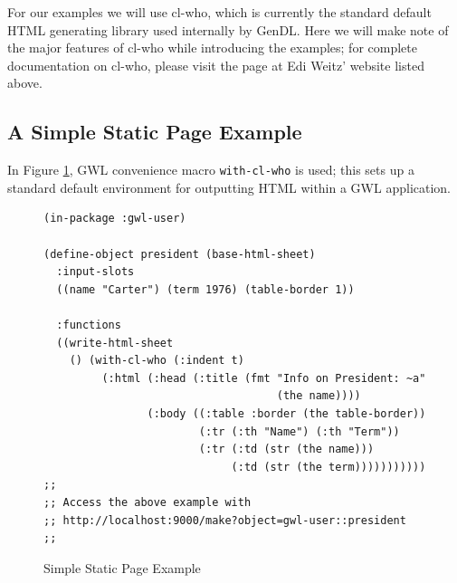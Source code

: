 \documentclass [11pt]{book}
\begin{document}
For our examples we will use cl-who, which is currently the
standard default HTML generating library used internally by
GenDL. Here we will make note of the major features of cl-who while
introducing the examples; for complete documentation on cl-who, please
visit the page at Edi Weitz' website listed above.



\subsection{A Simple Static Page Example}

\label{subsec:asimplestaticpageexample}



In Figure 
\ref{fig:gwl-1}, GWL convenience macro \texttt{with-cl-who} is used; this sets up a standard default environment for outputting HTML 
within a GWL application.
\begin{figure}
\begin{lrbox}{\boxedverb}
\begin{minipage}{\linewidth}
\tiny{

\begin{verbatim}(in-package :gwl-user)

(define-object president (base-html-sheet)
  :input-slots
  ((name "Carter") (term 1976) (table-border 1))

  :functions
  ((write-html-sheet
    () (with-cl-who (:indent t)
         (:html (:head (:title (fmt "Info on President: ~a" 
                                    (the name))))
                (:body ((:table :border (the table-border))
                        (:tr (:th "Name") (:th "Term"))
                        (:tr (:td (str (the name))) 
                             (:td (str (the term)))))))))))
;;
;; Access the above example with 
;; http://localhost:9000/make?object=gwl-user::president
;;

\end{verbatim}}
\end{minipage}
\end{lrbox}
\fbox{\usebox{\boxedverb}}

\caption{Simple Static Page Example}

\label{fig:gwl-1}

\end{figure}
\end{document}
